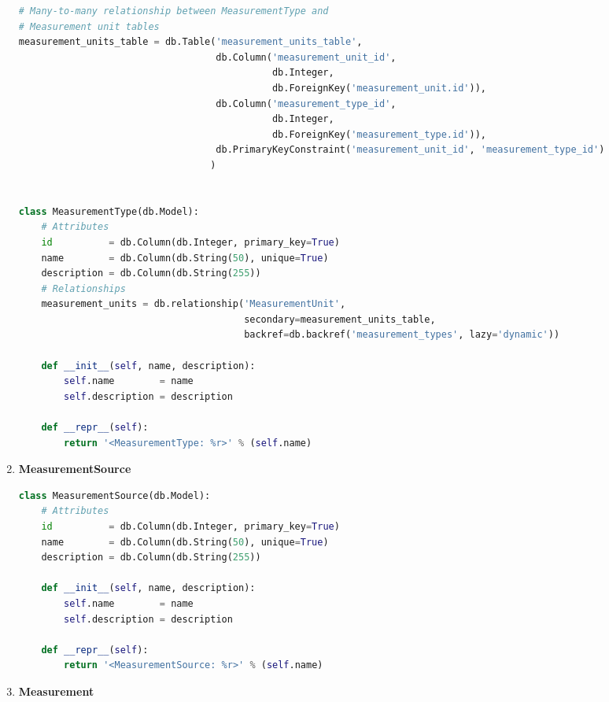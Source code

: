 \documentclass[a4paper,12pt]{article}
\begin{document}
\begin{enumerate}
\begin{lstlisting}[language=Python]
# Many-to-many relationship between MeasurementType and 
# Measurement unit tables
measurement_units_table = db.Table('measurement_units_table',
                                   db.Column('measurement_unit_id',
                                             db.Integer,
                                             db.ForeignKey('measurement_unit.id')),
                                   db.Column('measurement_type_id',
                                             db.Integer,
                                             db.ForeignKey('measurement_type.id')),
                                   db.PrimaryKeyConstraint('measurement_unit_id', 'measurement_type_id')
                                  )


class MeasurementType(db.Model):
    # Attributes
    id          = db.Column(db.Integer, primary_key=True)
    name        = db.Column(db.String(50), unique=True)
    description = db.Column(db.String(255))
    # Relationships
    measurement_units = db.relationship('MeasurementUnit',
                                        secondary=measurement_units_table,
                                        backref=db.backref('measurement_types', lazy='dynamic'))

    def __init__(self, name, description):
        self.name        = name
        self.description = description

    def __repr__(self):
        return '<MeasurementType: %r>' % (self.name)
\end{lstlisting}
	
\item \textbf{MeasurementSource}
	
\begin{lstlisting}[language=Python]
class MeasurementSource(db.Model):
    # Attributes
    id          = db.Column(db.Integer, primary_key=True)
    name        = db.Column(db.String(50), unique=True)
    description = db.Column(db.String(255))

    def __init__(self, name, description):
        self.name        = name
        self.description = description

    def __repr__(self):
        return '<MeasurementSource: %r>' % (self.name)
\end{lstlisting}
	
\item \textbf{Measurement}
	

\end{enumerate}
\end{document}
